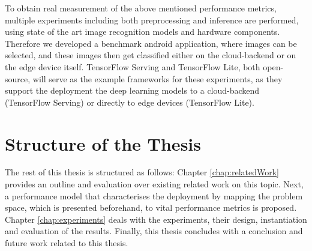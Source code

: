 To obtain real measurement of the above mentioned performance metrics, multiple experiments including both preprocessing and inference are performed, using state of the art image recognition models and hardware components. Therefore we developed a benchmark android application, where images can be selected, and these images then get classified either on the cloud-backend or on the edge device itself.
TensorFlow Serving and TensorFlow Lite, both open-source, will serve as the example frameworks for these experiments, as they support the deployment the deep learning models to a cloud-backend (TensorFlow Serving) or directly to edge devices (TensorFlow Lite).


\section{Structure of the Thesis}
The rest of this thesis is structured as follows: Chapter \ref{chap:relatedWork} provides an outline and evaluation over existing related work on this topic. Next, a performance model that characterises the deployment by mapping the problem space, which is presented beforehand, to vital performance metrics is proposed.
Chapter \ref{chap:experiments} deals with the experiments, their design, instantiation and evaluation of the results.
Finally, this thesis concludes with a conclusion and future work related to this thesis.
